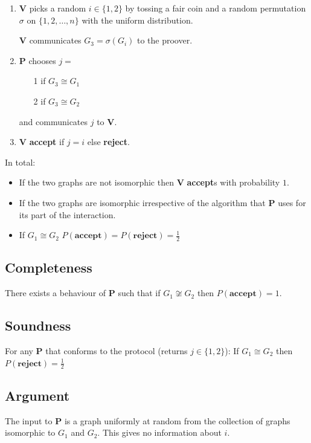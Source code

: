 \documentclass[a4paper,12pt]{article}
\theoremstyle{definition}
\theoremstyle{remark}
\begin{document}
\begin{enumerate}
    \item \textbf{V} picks a random $i \in \{1, 2\}$ by tossing a fair coin and a random permutation $\sigma$ on $\{1, 2, \dots, n\}$ with the uniform distribution.
        
    \textbf{V} communicates $G_3 = \sigma (G_i)$ to the proover.

    \item \textbf{P} chooses $j =$
    \begin{itemize}
        \item[1] if $G_3 \cong G_1$
        \item[2] if $G_3 \cong G_2$  
    \end{itemize}
    and communicates $j$ to \textbf{V}.
    
    \item \textbf{V} \textbf{accept} if $j = i$ else \textbf{reject}.
\end{enumerate}

In total:
\begin{itemize}
    \item If the two graphs are not isomorphic then \textbf{V} \textbf{accept}s with probability $1$.
    \item If the two graphs are isomorphic irrespective of the algorithm that \textbf{P} uses for its part of the interaction.
    \item If $G_1 \cong G_2$ $P(\textbf{accept}) = P(\textbf{reject})= \frac{1}{2}$
\end{itemize}

\subsection*{Completeness}
There exists a behaviour of \textbf{P} such that if $G_1 \not \cong G_2$ then $P(\textbf{accept}) = 1$.

\subsection*{Soundness}
For any \textbf{P} that conforms to the protocol (returns $j \in \{1, 2\}$):
If $G_1 \cong G_2$ then $P(\textbf{reject}) = \frac{1}{2}$

\subsection*{Argument}
The input to \textbf{P} is a graph uniformly at random from the collection of graphs isomorphic to $G_1$ and $G_2$.
This gives no information about $i$.
\end{document}
